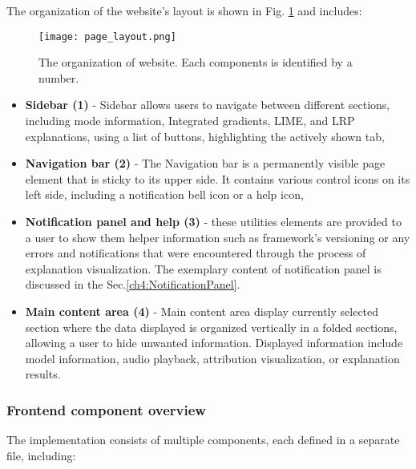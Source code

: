 \documentclass[
    bindingoffset=5mm,  %
    footnoteindent=3mm, %
    hyphenation=true    %
]{src/wut-thesis}
\begin{document}
The organization of the website's layout is shown in Fig. \ref{fig:PageLayout} and includes:

\begin{figure}[h!] %
    \centering
    \texttt{[image: page\_layout.png]}
    \caption{The organization of website. Each components is identified by a number.}
    \label{fig:PageLayout}
\end{figure}

\begin{itemize}
    \item \textbf{Sidebar (1)} - Sidebar allows users to navigate between different sections, including mode
        information, Integrated gradients, LIME, and LRP explanations, using a list of buttons, highlighting
        the actively shown tab,
    \item \textbf{Navigation bar (2)} - The Navigation bar is a permanently visible page element that is sticky
        to its upper side. It contains various control icons on its left side, including a notification
        bell icon or a help icon,
    \item \textbf{Notification panel and help (3)} - these utilities elements are provided
        to a user to show them helper information such as framework's versioning or any errors
        and notifications that were encountered through the process of explanation visualization.
        The exemplary content of notification panel is discussed in the Sec.\ref{ch4:NotificationPanel}. 
    \item \textbf{Main content area (4)} - Main content area display currently selected section
        where the data displayed is organized vertically in a folded sections, allowing a user
        to hide unwanted information. Displayed information include model information, audio playback,
        attribution visualization, or explanation results.
\end{itemize}

\subsubsection{Frontend component overview}

The implementation consists of multiple components,
each defined in a separate file, including:
\end{document}

